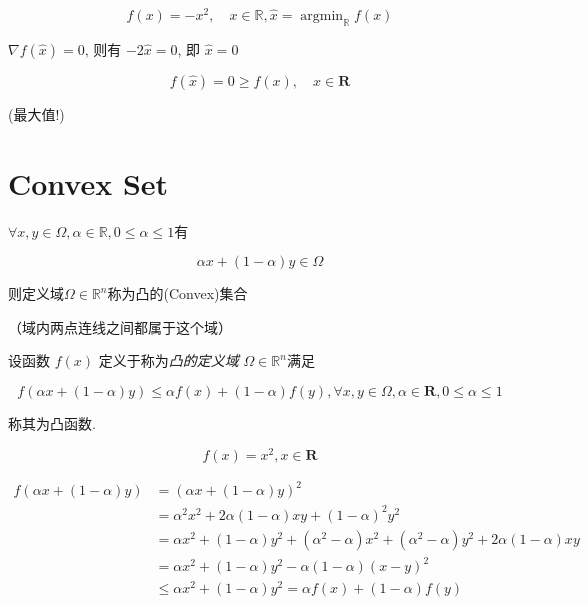 \begin{example}
    $$ f(x)=-x^{2}, \quad x \in \mathbb{R}, \hat{x}=\operatorname{argmin}_{\mathbb{R}} f(x) $$

    $ \nabla f(\hat{x})=0 $, 则有 $ -2 \hat{x}=0 $, 即 $ \hat{x}=0 $

    $$ f(\hat{x})=0 \geq f(x), \quad x \in \mathbf{R} $$


    (最大值!)
\end{example}

\section{Convex Set}

\begin{definition}[凸集]
    $ \forall x, y \in \Omega, \alpha \in \mathbb{R}, 0 \leq \alpha \leq 1 $有

    $$ \alpha x+(1-\alpha) y \in \Omega $$

    则定义域$ \Omega \in \mathbb{R}^{n} $称为凸的(Convex)集合

    （域内两点连线之间都属于这个域）
\end{definition}

\begin{definition}[凸函数]
    设函数 $ f(x) $ 定义于称为\textit{凸的定义域} $ \Omega \in \mathbb{R}^{n} $满足

    $$ f(\alpha x+(1-\alpha) y) \leq \alpha f(x)+(1-\alpha) f(y), \forall x, y \in \Omega, \alpha \in \mathbf{R}, 0 \leq \alpha \leq 1 $$

    称其为凸函数. 
\end{definition}


\begin{example}
    \label{Example:SquareIsConvex}
    $$ f(x)=x^{2}, x \in \mathbf{R} $$

    $$ \begin{aligned} f(\alpha x+(1-\alpha) y) &=(\alpha x+(1-\alpha) y)^{2} 
    \\ &=\alpha^{2} x^{2}+2 \alpha(1-\alpha) x y+(1-\alpha)^{2} y^{2} 
    \\ &=\alpha x^{2}+(1-\alpha) y^{2}+\left(\alpha^{2}-\alpha\right) x^{2}+\left(\alpha^{2}-\alpha\right) y^{2}+2 \alpha(1-\alpha) x y 
    \\ &=\alpha x^{2}+(1-\alpha) y^{2}-\alpha(1-\alpha)(x-y)^{2}
    \\ &\leq \alpha x^{2}+(1-\alpha) y^{2}=\alpha f(x)+(1-\alpha) f(y)
    \end{aligned} $$
\end{example}


